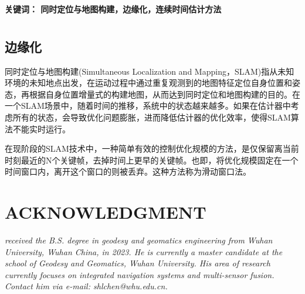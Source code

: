 \documentclass[12pt, twocolumn]{article}
\newcommand\normf{\fangsong}
\newcommand\keywords[1]{\bfseries{关键词：} \normf #1}
\begin{document}
	\noindent\keywords{同时定位与地图构建，边缘化，连续时间估计方法}
	
	\section{\normf{概述}}
	\normf\bfseries
	
	\subsection{\normf 边缘化}
	同时定位与地图构建(Simultaneous Localization and Mapping，SLAM)指从未知环境的未知地点出发，在运动过程中通过重复观测到的地图特征定位自身位置和姿态，再根据自身位置增量式的构建地图，从而达到同时定位和地图构建的目的。在一个SLAM场景中，随着时间的推移，系统中的状态越来越多。如果在估计器中考虑所有的状态，会导致优化问题膨胀，进而降低估计器的优化效率，使得SLAM算法不能实时运行。
	
	在现阶段的SLAM技术中，一种简单有效的控制优化规模的方法，是仅保留离当前时刻最近的N个关键帧，去掉时间上更早的关键帧。也即，将优化规模固定在一个时间窗口内，离开这个窗口的则被丢弃。这种方法称为滑动窗口法\cite{高翔2017视觉}。
	
	\newpage
	
	
		
	\newpage
	\section*{ACKNOWLEDGMENT}
	\begin{tcolorbox}[colback=white,colframe=white!70!black,title={\bfseries Author Information}]
	\par\noindent
		\parbox[t]{\linewidth}{
	 \noindent{}
	 \emph{
	 received the B.S. degree in geodesy and geomatics engineering from Wuhan University, Wuhan China, in 2023.
	 He is currently a master candidate at the school of Geodesy and Geomatics, Wuhan University. His area of research currently focuses on integrated navigation systems and multi-sensor fusion.
	 Contact him via e-mail: shlchen@whu.edu.cn.
	 }}
	\end{tcolorbox}
		
		
\end{document}
